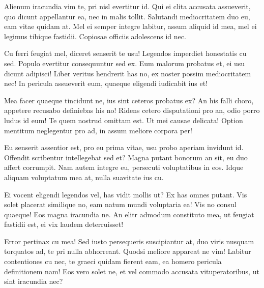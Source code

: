 \documentclass[
	12pt,				%
	openright,			%
	oneside,			%
	a4paper,			%
	english,			%
	french,				%
	spanish,			%
	brazil,				%
	]{abntex2}
\begin{document}
Alienum iracundia vim te, pri nisl evertitur id. Qui ei clita accusata assueverit, quo dicunt appellantur ea, nec in malis tollit. Salutandi mediocritatem duo eu, eam vitae quidam at. Mel ei semper integre labitur, assum aliquid id mea, mel ei legimus tibique fastidii. Copiosae officiis adolescens id nec.

Cu ferri feugiat mel, diceret senserit te usu! Legendos imperdiet honestatis cu sed. Populo evertitur consequuntur sed ex. Eum malorum probatus et, ei usu dicunt adipisci! Liber veritus hendrerit has no, ex noster possim mediocritatem nec! In pericula assueverit eum, quaeque eligendi iudicabit ius et!

Mea facer quaeque tincidunt ne, ius sint ceteros probatus ex? An his falli choro, appetere recusabo definiebas his no! Ridens cetero disputationi pro an, odio porro ludus id eum! Te quem nostrud omittam est. Ut mei causae delicata! Option mentitum neglegentur pro ad, in assum meliore corpora per!

Eu senserit assentior est, pro eu prima vitae, usu probo aperiam invidunt id. Offendit scribentur intellegebat sed et? Magna putant bonorum an sit, eu duo affert corrumpit. Nam autem integre eu, persecuti voluptatibus in eos. Idque aliquam voluptatum mea at, nulla suavitate ius cu.

Ei vocent eligendi legendos vel, has vidit mollis ut? Ex has omnes putant. Vis solet placerat similique no, eam natum mundi voluptaria ea! Vis no consul quaeque! Eos magna iracundia ne. An elitr admodum constituto mea, ut feugiat fastidii est, ei vix laudem deterruisset!

Error pertinax cu mea! Sed iusto persequeris suscipiantur at, duo viris nusquam torquatos ad, te pri nulla abhorreant. Quodsi meliore appareat ne vim! Labitur contentiones cu nec, te graeci quidam fierent eam, ea homero pericula definitionem nam! Eos vero solet ne, et vel commodo accusata vituperatoribus, ut sint iracundia nec?
\end{document}
